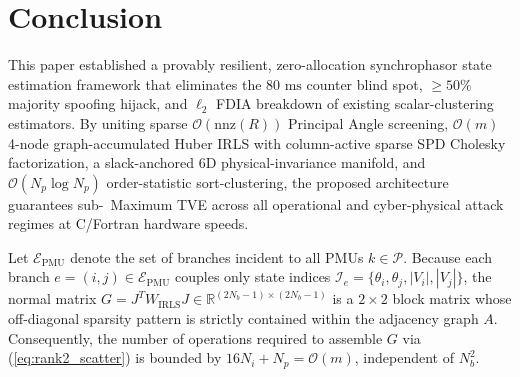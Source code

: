 \documentclass[journal,twoside]{IEEEtran}
\begin{document}
\section{Conclusion}
This paper established a provably resilient, zero-allocation synchrophasor state estimation framework that eliminates the $80\text{~ms}$ counter blind spot, $\ge 50\%$ majority spoofing hijack, and $\ell_2$ FDIA breakdown of existing scalar-clustering estimators. By uniting sparse $\mathcal{O}(\mathrm{nnz}(R))$ Principal Angle screening, $\mathcal{O}(m)$ 4-node graph-accumulated Huber IRLS with column-active sparse SPD Cholesky factorization, a slack-anchored 6D physical-invariance manifold, and $\mathcal{O}(N_p \log N_p)$ order-statistic sort-clustering, the proposed architecture guarantees sub-\MaxTVEThirty\ Maximum TVE across all operational and cyber-physical attack regimes at C/Fortran hardware speeds.

Let $\mathcal{E}_{\mathrm{PMU}}$ denote the set of branches incident to all PMUs $k \in \mathcal{P}$. Because each branch $e = (i, j) \in \mathcal{E}_{\mathrm{PMU}}$ couples only state indices $\mathcal{I}_e = \{\theta_i, \theta_j, |V_i|, |V_j|\}$, the normal matrix $G = J^T W_{\mathrm{IRLS}} J \in \mathbb{R}^{(2N_b-1)\times(2N_b-1)}$ is a $2 \times 2$ block matrix whose off-diagonal sparsity pattern is strictly contained within the adjacency graph $A$. Consequently, the number of operations required to assemble $G$ via (\ref{eq:rank2_scatter}) is bounded by $16 N_i + N_p = \mathcal{O}(m)$, independent of $N_b^2$.



\end{document}
